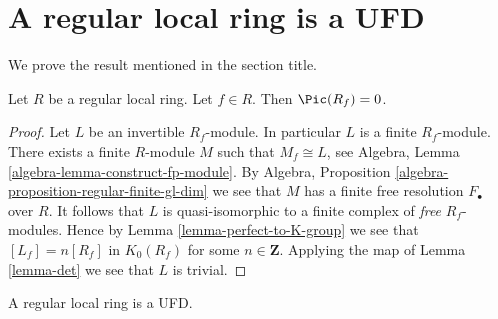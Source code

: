 \section{A regular local ring is a UFD}
\label{section-regular-local-UFD}

\noindent
We prove the result mentioned in the section title.

\begin{lemma}
\label{lemma-regular-local-Pic-zero}
Let $R$ be a regular local ring. Let $f \in R$.
Then $\Pic(R_f) = 0$.
\end{lemma}

\begin{proof}
Let $L$ be an invertible $R_f$-module. In particular $L$ is
a finite $R_f$-module. There exists a finite $R$-module
$M$ such that $M_f \cong L$, see
Algebra, Lemma \ref{algebra-lemma-construct-fp-module}.
By Algebra, Proposition \ref{algebra-proposition-regular-finite-gl-dim}
we see that $M$ has a finite free resolution $F_\bullet$ over $R$.
It follows that $L$ is quasi-isomorphic to a finite complex
of {\it free} $R_f$-modules. Hence by
Lemma \ref{lemma-perfect-to-K-group} we see that
$[L_f] = n[R_f]$ in $K_0(R_f)$ for some $n \in \mathbf{Z}$.
Applying the map of Lemma \ref{lemma-det}
we see that $L$ is trivial.
\end{proof}

\begin{lemma}
\label{lemma-regular-local-UFD}
A regular local ring is a UFD.
\end{lemma}

